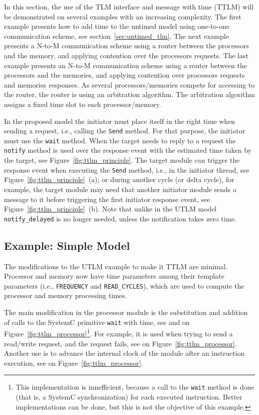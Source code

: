 In this section, the use of the TLM interface and message with time
(TTLM) will be demonstrated on several examples with an increasing
complexity. The first example presents how to add time to the untimed
model using one-to-one communication scheme, see
section~\ref{sec:untimed_tlm}. The next example presents a N-to-M
communication scheme using a router between the processors and the
memory, and applying contention over the processors requests. The last
example presents an N-to-M communication scheme using a router between
the processors and the memories, and applying contention over
processors requests and memories responses. As several
processors/memories compete for accessing to the router, the router is
using an arbitration algorithm.  The arbitration algorithm assigns a
fixed time slot to each processor/memory.

In the proposed model the initiator must place itself in the right
time when sending a request, i.e., calling the \texttt{Send} method.
For that purpose, the initiator must use the \texttt{wait} method.
When the target needs to reply to a request the \texttt{notify} method
is used over the response event with the estimated time taken by the
target, see Figure~\ref{fig:ttlm_principle}. The target module
  can trigger the response event when executing the \texttt{Send}
  method, i.e., in the initiator thread, see
  Figure~\ref{fig:ttlm_principle}~(a); or during another cycle (or
  delta cycle), for example, the target module may need that another
  initiator module sends a message to it before triggering the first
  initiator response event, see Figure~\ref{fig:ttlm_principle}~(b).
Note that unlike in the UTLM model \texttt{notify\_delayed} is no
longer needed, unless the notification takes zero time.

\subsection{Example: Simple Model}
The modifications to the UTLM example to make it TTLM are minimal.
Processor and memory now have time parameters among their template
parameters (i.e., \texttt{FREQUENCY} and \texttt{READ\_CYCLES}), which
are used to compute the processor and memory processing times.

The main modification in the processor module is the substitution and
addition of calls to the SystemC primitive \texttt{wait} with time,
see {\large {}} and {\large {}} on
Figure~\ref{fig:ttlm_processor}\footnote{This implementation is
  innefficient, because a call to the \texttt{wait} method is done
  (that is, a SystemC synchronization) for each executed instruction.
  Better implementations can be done, but this is not the objective of
  this example.}. For example, it is used when trying to send a
read/write request, and the request fails, see {\large {}} on
Figure~\ref{fig:ttlm_processor}.  Another use is to advance the
internal clock of the module after an instruction execution, see
{\large {}} on Figure~\ref{fig:ttlm_processor}.

